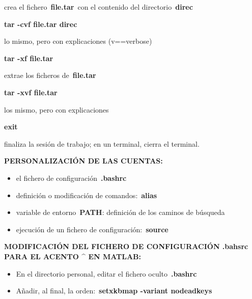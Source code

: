 \documentclass[
  a4paper,
]{article}
\providecommand{\tightlist}{%
  \setlength{\itemsep}{0pt}\setlength{\parskip}{0pt}}\usepackage{longtable,booktabs,array}
\begin{document}
crea el fichero~\textbf{file.tar}~con el contenido del
directorio~\textbf{direc}

\textbf{tar -cvf file.tar direc}

lo mismo, pero con explicaciones (v==verbose)

\textbf{tar -xf file.tar}

extrae los ficheros de~\textbf{file.tar}

\textbf{tar -xvf file.tar}

los mismo, pero con explicaciones

\textbf{exit}

finaliza la sesión de trabajo; en un terminal, cierra el terminal.

\textbf{PERSONALIZACIÓN DE LAS CUENTAS:}

\begin{itemize}
\tightlist
\item
  el fichero de configuración~\textbf{.bashrc}
\item
  definición o modificación de comandos:~\textbf{alias}
\item
  variable de entorno~\textbf{PATH}: definición de los caminos de
  búsqueda
\item
  ejecución de un fichero de configuración:~\textbf{source}
\end{itemize}

\textbf{MODIFICACIÓN DEL FICHERO DE CONFIGURACIÓN .bahsrc PARA EL ACENTO
\^{} EN MATLAB:}

\begin{itemize}
\tightlist
\item
  En el directorio personal, editar el fichero oculto~\textbf{.bashrc}
\item
  Añadir, al final, la orden:~\textbf{setxkbmap -variant nodeadkeys}
\end{itemize}


\printbibliography
\end{document}
